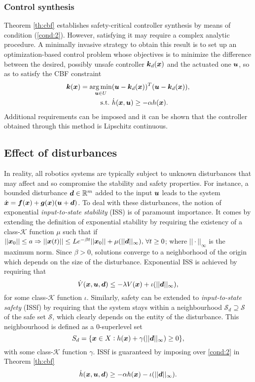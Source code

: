 \subsubsection{Control synthesis}
Theorem \ref{th:cbf} establishes safety-critical controller 
synthesis by means of condition (\ref{cond:2}). However, satisfying  it may require a complex analytic procedure. A minimally invasive strategy to obtain this result is to set up an optimization-based control problem whose objectives is to minimize the difference between the desired, possibly unsafe controller $\boldsymbol{k}_d(\boldsymbol{x})$ and the actuated one $\boldsymbol{u}$, so as to satisfy the CBF constraint
\begin{equation}\label{eq:optprob}
\begin{aligned}
\boldsymbol{k}(\boldsymbol{x})=\underset{\boldsymbol{u}\in U}{\arg\min}  &(\boldsymbol{u}-\boldsymbol{k}_d(\boldsymbol{x}))^T(\boldsymbol{u}-\boldsymbol{k}_d(\boldsymbol{x})), \\ 
\mathrm{s.t.}\,\, &\dot{h}(\boldsymbol{x},\boldsymbol{u})\geq -\alpha h(\boldsymbol{x}).
\end{aligned}
\end{equation}
Additional requirements can be imposed and it can be shown that the controller obtained through this method is Lipschitz continuous.
\subsection{Effect of disturbances}
In reality, all robotics systems are typically subject to unknown disturbances that may affect and so compromise the stability and safety properties. For instance, a bounded disturbance $\boldsymbol{d}\in\mathbb{R}^m$ added to the input $\boldsymbol{u}$ leads to the system $\dot{\boldsymbol{x}} = \boldsymbol{f}(\boldsymbol{x})+\boldsymbol{g}(\boldsymbol{x})(\boldsymbol{u}+\boldsymbol{d})$. To deal with these disturbances, the notion of exponential \textit{input-to-state stability} (ISS) is of paramount importance. It comes by extending the definition of exponential stability by requiring the existency of a class-$\mathcal{K}$ function $\mu$ such that if $||\boldsymbol{x}_0||  \leq a \Rightarrow  ||\boldsymbol{x}(t)||\leq Le^{-\beta t}||\boldsymbol{x}_0||+ \mu(||\boldsymbol{d}||_\infty ),\, \forall t \geq 0$; where $||\cdot||_\infty$  is the maximum norm.
Since $\beta>0$, solutions converge to a neighborhood of the origin which depends on the size of the disturbance. Exponential ISS is achieved by requiring that
\begin{equation}\label{eq:iss}
\dot{V}(\boldsymbol{x},\boldsymbol{u},\boldsymbol{d}) \leq -\lambda V(\boldsymbol{x})+\iota( ||\boldsymbol{d}||_\infty),
\end{equation} for some class-$\mathcal{K}$ function $\iota$. Similarly, safety can be extended to \textit{input-to-state safety} (ISSf) by requiring that the system stays within a neighbourhood $\mathcal{S}_d \supseteq  \mathcal{S}$ of the safe set $\mathcal{S}$, which clearly depends on the entity of the disturbance.
This neighbourhood is defined as a 0-superlevel set
\begin{equation}
    S_d = \{\boldsymbol{x} \in X: h(\boldsymbol{x}) + \gamma(||\boldsymbol{d}||_\infty)\geq 0\},
\end{equation}
with some class-$\mathcal{K}$ function $\gamma$. ISSf is guaranteed by imposing over \eqref{cond:2} in Theorem \ref{th:cbf}
\begin{equation}
    \dot{h}(\boldsymbol{x},\boldsymbol{u},\boldsymbol{d})\geq -\alpha h(\boldsymbol{x}) - \iota(||\boldsymbol{d}||_\infty).
\end{equation}